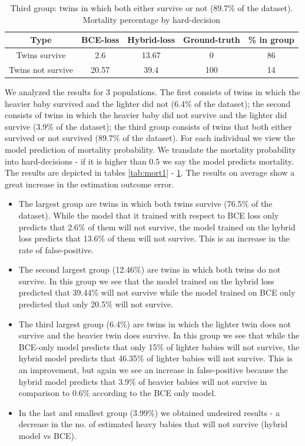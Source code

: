 \documentclass[oneside,12pt]{article}
\begin{document}
%
%
\begin{table}[t]
\centering
 \begin{tabular}{||c | c | c | c | c ||}
 \hline
 Type & BCE-loss & Hybrid-loss & Ground-truth & \% in group \\ [0.5ex] 
 \hline\hline
 Twins survive & 2.6 & 13.67 & 0 & 86\\ 
 \hline
 Twins not survive & 20.57 & 39.4 & 100 & 14\\ [1ex]
 \hline
\end{tabular}
\caption{Third group: twins in which both either survive or not (89.7\% of the dataset). Mortality percentage by hard-decision}
\label{tab:mort3}
\end{table}
%
We analyzed the results for 3 populations. The first consists of twins in which the heavier baby survived and the lighter did not (6.4\% of the dataset); the second consists of twins in which the heavier baby did not survive and the lighter did survive (3.9\% of the dataset); the third group consists of twins that both either survived or not survived (89.7\% of the dataset). For each individual we view the model prediction of mortality probability. We translate the mortality probability into hard-decisions - if it is higher than $0.5$ we say the model predicts mortality. The results are depicted in tables \ref{tab:mort1} - \ref{tab:mort3}. The results on average show a great increase in the estimation outcome error.
%
\begin{itemize}
    \item The largest group are twins in which both twins survive (76.5\% of the dataset). While the model that it trained with respect to BCE loss only predicts that 2.6\% of them will not survive, the model trained on the hybrid loss predicts that 13.6\% of them will not survive. This is an increase in the rate of false-positive.
    \item The second largest group (12.46\%) are twins in which both twins do not survive. In this group we see that the model trained on the hybrid loss predicted that 39.44\% will not survive while the model trained on BCE only predicted that only 20.5\% will not survive. 
    \item The third largest group (6.4\%) are twins in which the lighter twin does not survive and the heavier twin does survive. In this group we see that while the BCE-only model predicts that only 15\% of lighter babies will not survive, the hybrid model predicts that 46.35\% of lighter babies will not survive. This is an improvement, but again we see an increase in false-positive because the hybrid model predicts that 3.9\% of heavier babies will not survive in comparison to 0.6\% according to the BCE only model.
    \item In the last and smallest group (3.99\%) we obtained undesired results - a decrease in the no. of estimated heavy babies that will not survive (hybrid model vs BCE). 
\end{itemize} 
%
\end{document}
